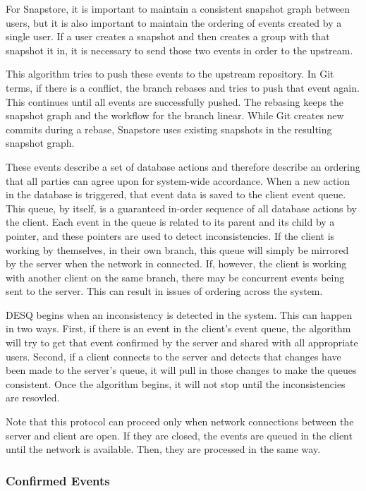 For Snapstore, it is important to maintain a consistent snapshot graph between users, but it is also important to maintain the ordering of events created by a single user. If a user creates a snapshot and then creates a group with that snapshot it in, it is necessary to send those two events in order to the upstream. 

This algorithm tries to push these events to the upstream repository. In Git terms, if there is a conflict, the branch rebases and tries to push that event again. This continues until all events are successfully pushed. The rebasing keeps the snapshot graph and the workflow for the branch linear. While Git creates new commits during a rebase, Snapstore uses existing snapshots in the resulting snapshot graph.

These events describe a set of database actions and therefore describe an ordering that all parties can agree upon for system-wide accordance. When a new action in the database is triggered, that event data is saved to the client event queue. This queue, by itself, is a guaranteed in-order sequence of all database actions by the client. Each event in the queue is related to its parent and its child by a pointer, and these pointers are used to detect inconsistencies. If the client is working by themselves, in their own branch, this queue will simply be mirrored by the server when the network in connected. If, however, the client is working with another client on the same branch, there may be concurrent events being sent to the server. This can result in issues of ordering across the system.

DESQ begins when an inconsistency is detected in the system. This can happen in two ways. First, if there is an event in the client's event queue, the algorithm will try to get that event confirmed by the server and shared with all appropriate users. Second, if a client connects to the server and detects that changes have been made to the server's queue, it will pull in those changes to make the queues consistent. Once the algorithm begins, it will not stop until the inconsistencies are resovled. 

Note that this protocol can proceed only when network connections between the server and client are open. If they are closed, the events are queued in the client until the network is available. Then, they are processed in the same way.

\subsubsection{Confirmed Events}

